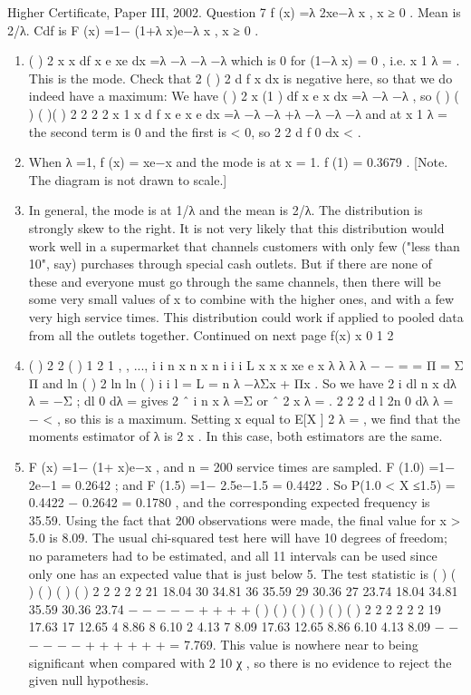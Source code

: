 \documentclass[a4paper,12pt]{article}
\begin{document}
Higher Certificate, Paper III, 2002. Question 7
f (x) =λ 2xe−λ x , x ≥ 0 . Mean is 2/λ. Cdf is F (x) =1− (1+λ x)e−λ x , x ≥ 0 .
\begin{enumerate}
\item  ( ) 2 { x x} df x
e xe
dx
=λ −λ −λ −λ which is 0 for (1−λ x) = 0 , i.e. x 1
λ
= . This is the
mode. Check that 2 ( )
2
d f x
dx
is negative here, so that we do indeed have a maximum:
We have ( ) 2 x (1 ) df x
e x
dx
=λ −λ −λ , so ( ) ( ) ( )( ) 2
2 2
2 x 1 x d f x
e x e
dx
=λ −λ −λ +λ −λ −λ −λ
and at x 1
λ
= the second term is 0 and the first is < 0, so
2
2 d f 0
dx
< .
\item  When λ =1, f (x) = xe−x and the mode is at x = 1. f (1) = 0.3679 .
[Note. The diagram is not drawn to scale.]
\item  In general, the mode is at 1/λ and the mean is 2/λ. The distribution is strongly
skew to the right. It is not very likely that this distribution would work well in a
supermarket that channels customers with only few ("less than 10", say) purchases
through special cash outlets. But if there are none of these and everyone must go
through the same channels, then there will be some very small values of x to combine
with the higher ones, and with a few very high service times. This distribution could
work if applied to pooled data from all the outlets together.
Continued on next page
f(x)
x
0 1 2
\item  ( ) 2 2 ( )
1 2
1
, , ..., i i
n
x n x
n i i
i
L x x x xe e x λ λ λ λ − −
=
= Π = Σ Π
and ln ( ) 2 ln ln ( ) i i l = L = n λ −λΣx + Πx .
So we have 2
i
dl n x
dλ λ
= −Σ ; dl 0
dλ
= gives 2
ˆ i
n x
λ
=Σ or ˆ 2
x
λ = .
2
2 2
d l 2n 0
dλ λ
= − < , so this is a maximum.
Setting x equal to E[X ] 2
λ
= , we find that the moments estimator of λ is 2
x
. In this
case, both estimators are the same.
\item  F (x) =1− (1+ x)e−x , and n = 200 service times are sampled.
F (1.0) =1− 2e−1 = 0.2642 ; and F (1.5) =1− 2.5e−1.5 = 0.4422 .
So P(1.0 < X ≤1.5) = 0.4422 − 0.2642 = 0.1780 , and the corresponding expected
frequency is 35.59.
Using the fact that 200 observations were made, the final value for x > 5.0 is 8.09.
The usual chi-squared test here will have 10 degrees of freedom; no parameters had
to be estimated, and all 11 intervals can be used since only one has an expected value
that is just below 5. The test statistic is
( ) ( ) ( ) ( ) ( ) 2 2 2 2 2 21 18.04 30 34.81 36 35.59 29 30.36 27 23.74
18.04 34.81 35.59 30.36 23.74
− − − − −
+ + + +
( ) ( ) ( ) ( ) ( ) ( ) 2 2 2 2 2 2 19 17.63 17 12.65 4 8.86 8 6.10 2 4.13 7 8.09
17.63 12.65 8.86 6.10 4.13 8.09
− − − − − −
+ + + + + +
= 7.769.
This value is nowhere near to being significant when compared with 2
10 χ , so there is
no evidence to reject the given null hypothesis.
\end{enumerate}
\end{document}
